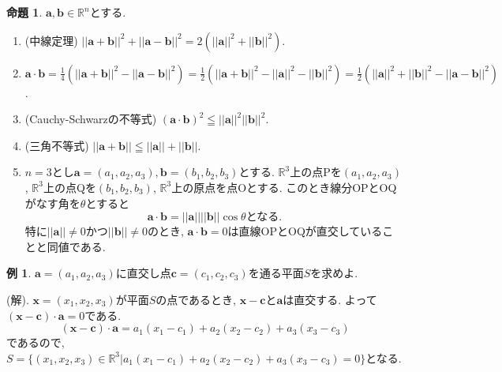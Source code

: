 \documentclass[dvipdfmx,a4paper,11pt]{article}
\newcommand{\R}{\mathbb{R}}
\theoremstyle{definition}
\newtheorem{prop}[thm]{命題}
\newtheorem{exa}[thm]{例}
\begin{document}
\begin{tcolorbox}[
    colback = white,
    colframe = green!35!black,
    fonttitle = \bfseries,
    breakable = true]
    \begin{prop}
$\bm{a}, \bm{b} \in \R^n$とする.
\begin{enumerate}
\item (中線定理) $||\bm{a} + \bm{b}||^2 + ||\bm{a} - \bm{b}||^2 = 2(||\bm{a}||^2 + ||\bm{b}||^2)$.
\item $\bm{a} \cdot\bm{b} = \frac{1}{4}(||\bm{a} + \bm{b}||^2 - ||\bm{a} - \bm{b}||^2)
= \frac{1}{2}(||\bm{a} + \bm{b}||^2 - ||\bm{a} ||^2- || \bm{b}||^2)
= \frac{1}{2}(||\bm{a} ||^2 + || \bm{b}||^2 - ||\bm{a} - \bm{b}||^2)$.
\item (Cauchy-Schwarzの不等式) $(\bm{a} \cdot\bm{b})^2 \leqq ||\bm{a} ||^2 ||\bm{b} ||^2 $.
\item (三角不等式) $ ||\bm{a} + \bm{b} ||   \leqq ||\bm{a} || +  ||\bm{b} ||  $.
\item $n=3$とし$\bm{a} =(a_1, a_2, a_3), \bm{b}=(b_1, b_2, b_3)$とする.
$\R^3$上の点Pを$(a_1, a_2, a_3)$, $\R^3$上の点Qを$(b_1, b_2, b_3)$, $\R^3$上の原点を点Oとする.
このとき線分OPとOQがなす角を$\theta$とすると
$$
\bm{a} \cdot\bm{b} = ||\bm{a} || || \bm{b}|| \cos \theta \text{となる.}
$$
特に$||\bm{a} ||  \neq 0$かつ$|| \bm{b}|| \neq0$のとき, $\bm{a} \cdot\bm{b} =0$は直線OPとOQが直交していることと同値である.
\end{enumerate}
    \end{prop}
 \end{tcolorbox}
\begin{exa}
$\bm{a} = (a_1, a_2, a_3)$に直交し点$\bm{c} = (c_1, c_2, c_3)$を通る平面$S$を求めよ.

(解). $\bm{x}=(x_1, x_2, x_3)$が平面$S$の点であるとき, $\bm{x} - \bm{c}$と$\bm{a}$は直交する.
よって
$(\bm{x} - \bm{c}) \cdot \bm{a} =0$である.
$$
(\bm{x} - \bm{c}) \cdot \bm{a} = 
a_1(x_1 - c_1) +a_2(x_2 - c_2) +a_3(x_3 - c_3)
$$
であるので, $S = \{ (x_1, x_2, x_3) \in \R^3 | a_1(x_1 - c_1) +a_2(x_2 - c_2) +a_3(x_3 - c_3)=0\} $となる.
\end{exa}
\end{document}
